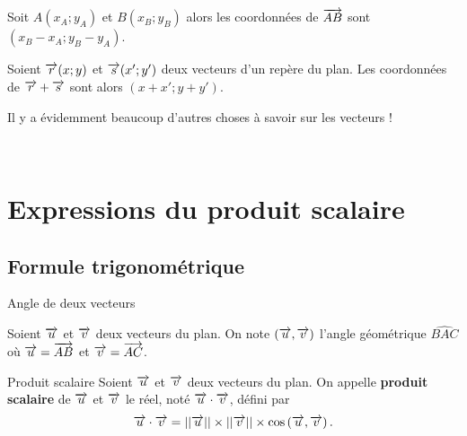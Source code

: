 \documentclass[11pt]{article}
\begin{document}
\begin{minipage}[b]{.5\textwidth}
\begin{prop}
  Soit $A\left( x_A; y_A \right)$ et $B\left( x_B; y_B \right)$ alors les
  coordonnées de $\overrightarrow{AB}$ sont $(x_B-x_A; y_B-y_A)$.
\end{prop}

\begin{prop}
  Soient $\overrightarrow{r}(x;y)$ et $\overrightarrow{s}(x';y')$ deux vecteurs d'un repère du plan.
  Les coordonnées de $\overrightarrow{r} +\overrightarrow{s}$ sont alors $(x+x';y+y')$.
\end{prop}
\end{minipage}

\begin{rmq}
  Il y a évidemment beaucoup d'autres choses à savoir sur les vecteurs !
\end{rmq}~\\[-13mm]

\section{Expressions du produit scalaire}
\subsection{Formule trigonométrique}
\begin{defi}{Angle de deux vecteurs}~\\[-5mm]
  \begin{minipage}{.8\textwidth}
    Soient $\overrightarrow{u}$ et $\overrightarrow{v}$ deux vecteurs du plan. On note $(\overrightarrow{u},
    \overrightarrow{v})$ l'angle géométrique $\widehat{BAC}$ où $\overrightarrow{u}=\overrightarrow{AB}$ et
    $\overrightarrow{v}=\overrightarrow{AC}$. 
  \end{minipage}
  \begin{minipage}{.2\textwidth}
    \begin{center}
    \end{center}
  \end{minipage}
\end{defi}

\begin{defi}{Produit scalaire}
  Soient $\overrightarrow{u}$ et $\overrightarrow{v}$ deux vecteurs du plan. On appelle
  \textbf{produit scalaire} de $\overrightarrow{u}$ et $\overrightarrow{v}$ le réel, noté $\overrightarrow{u}\cdot\overrightarrow{v}$, défini par
  \[
    \overrightarrow{u}\cdot\overrightarrow{v}=||\overrightarrow{u}||\times||\overrightarrow{v}||\times\cos\left( \overrightarrow{u},
    \overrightarrow{v} \right).
  \]
\end{defi}
\end{document}
